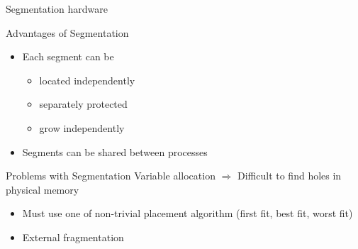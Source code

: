 \begin{frame}{Segmentation hardware}
  \centering
  \mode<beamer>{ \texttt{[image: osc-8-49]} }%
  \label{fig:segmentation-hardware}
\end{frame}


\begin{frame}
  \centering
\end{frame}

\begin{frame}
  \begin{iblock}{Advantages of Segmentation}
    \begin{itemize}
    \item Each segment can be
      \begin{itemize}
      \item located independently
      \item separately protected
      \item grow independently
      \end{itemize}
    \item Segments can be shared between processes
    \end{itemize}
  \end{iblock}
  \begin{iblock}{Problems with Segmentation}
    Variable allocation \(\Rightarrow\) Difficult to find holes in physical memory
    \begin{itemize}
    \item Must use one of non-trivial placement algorithm (first fit, best fit, worst fit)
    \item External fragmentation
    \end{itemize}
  \end{iblock}
\end{frame}

